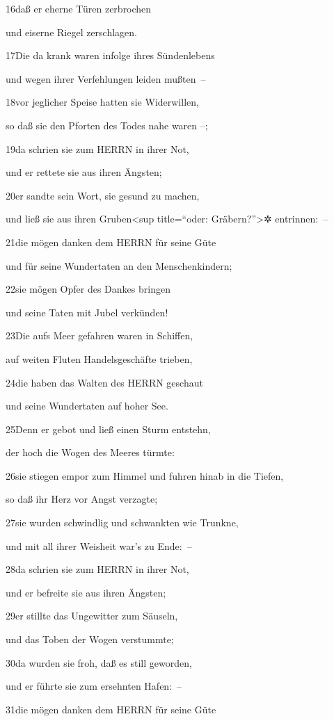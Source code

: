 16daß er eherne Türen zerbrochen

und eiserne Riegel zerschlagen.

17Die da krank waren infolge ihres Sündenlebens

und wegen ihrer Verfehlungen leiden mußten~--

18vor jeglicher Speise hatten sie Widerwillen,

so daß sie den Pforten des Todes nahe waren --;

19da schrien sie zum HERRN in ihrer Not,

und er rettete sie aus ihren Ängsten;

20er sandte sein Wort, sie gesund zu machen,

und ließ sie aus ihren Gruben\textless sup title=``oder:
Gräbern?''\textgreater✲ entrinnen:~--

21die mögen danken dem HERRN für seine Güte

und für seine Wundertaten an den Menschenkindern;

22sie mögen Opfer des Dankes bringen

und seine Taten mit Jubel verkünden!

23Die aufs Meer gefahren waren in Schiffen,

auf weiten Fluten Handelsgeschäfte trieben,

24die haben das Walten des HERRN geschaut

und seine Wundertaten auf hoher See.

25Denn er gebot und ließ einen Sturm entstehn,

der hoch die Wogen des Meeres türmte:

26sie stiegen empor zum Himmel und fuhren hinab in die Tiefen,

so daß ihr Herz vor Angst verzagte;

27sie wurden schwindlig und schwankten wie Trunkne,

und mit all ihrer Weisheit war's zu Ende:~--

28da schrien sie zum HERRN in ihrer Not,

und er befreite sie aus ihren Ängsten;

29er stillte das Ungewitter zum Säuseln,

und das Toben der Wogen verstummte;

30da wurden sie froh, daß es still geworden,

und er führte sie zum ersehnten Hafen:~--

31die mögen danken dem HERRN für seine Güte

